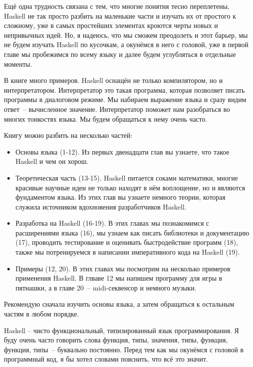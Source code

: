 Ещё одна трудность связана с тем, что многие понятия
тесно переплетены, Haskell не так просто разбить на 
маленькие части и изучать их от простого к сложному,
уже в самых простейших элементах кроются черты 
новых и непривычных идей. Но, я надеюсь, что мы сможем 
преодолеть и этот барьер, мы не будем изучать Haskell
по кусочкам, а окунёмся в него с головой, уже в первой
главе мы пробежимся по всему языку и далее будем
углубляться в отдельные моменты. 

В книге много примеров. Haskell оснащён
не только компилятором, но и интерпретатором. Интерпретатор
это такая программа, которая позволяет писать программы в диалоговом
режиме. Мы набираем выражение языка и сразу видим 
ответ~-- вычисленное значение. Интерпретатор поможет нам
разобраться во многих тонкостях языка. Мы будем обращаться к 
нему очень часто.

Книгу можно разбить на несколько частей:

\begin{itemize}
\item Основы языка (1-12). Из первых двенадцати глав вы узнаете,
что такое Haskell и чем он хорош. 

\item Теоретическая часть (13-15). Haskell питается соками математики,
многие красивые научные идеи не только находят в нём воплощение, 
но и являются фундаментом языка. Из этих глав вы узнаете немного
теории, которая служила источником вдохновения разработчиков Haskell.

\item Разработка на Haskell (16-19). В этих главах 
мы познакомимся с расширениями языка (16), 
мы узнаем как писать библиотеки
и документацию (17), проводить тестирование и оценивать 
быстродействие программ (18), также мы потренируемся в 
написании императивного кода на Haskell (19).

\item Примеры (12, 20). В этих главах мы посмотрим
на несколько примеров применения Haskell. В глваве 12
мы напишем программу для игры в пятнашки, а в главе
20~-- midi-секвенсор и немного музыки.

\end{itemize}

Рекомендую сначала изучить основы языка, а затем обращаться к 
остальным частям в любом порядке. 


Haskell -- чисто функциональный, типизированный язык программирования.
Я  буду очень часто говорить слова функция, типы, значения, типы, функция,
функция, типы~-- буквально постоянно. Перед тем как мы окунёмся с 
головой в программный код, я бы хотел словами пояснить, что всё это
значит. 

